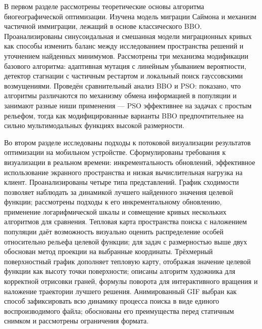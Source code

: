 \documentclass[14pt, russian]{scrartcl}
\begin{document}
В первом разделе рассмотрены теоретические основы алгоритма
биогеографической оптимизации. Изучена модель миграции Саймона и
механизм частичной иммиграции, лежащий в основе классического BBO.
Проанализированы синусоидальная и смешанная модели миграционных кривых
как способы изменить баланс между исследованием пространства решений и
уточнением найденных минимумов. Рассмотрены три механизма модификации
базового алгоритма: адаптивная мутация с линейным убыванием вероятности,
детектор стагнации с частичным рестартом и локальный поиск гауссовскими
возмущениями. Проведён сравнительный анализ BBO и PSO: 
показано, что алгоритмы различаются по механизму обмена
информацией в популяции и занимают разные ниши применения --- PSO
эффективнее на задачах с простым рельефом, тогда как модифицированные
варианты BBO предпочтительнее на сильно мультимодальных функциях высокой
размерности.

Во втором разделе исследованы подходы к потоковой визуализации
результатов оптимизации на мобильном устройстве. Сформулированы
требования к визуализации в реальном времени: инкрементальность
обновлений, эффективное использование экранного пространства и низкая
вычислительная нагрузка на клиент. Проанализированы четыре типа
представлений. График сходимости позволяет наблюдать за динамикой
лучшего найденного значения целевой функции; рассмотрены подходы к его
инкрементальному обновлению, применение логарифмической шкалы и
совмещение кривых нескольких алгоритмов для сравнения. Тепловая карта
пространства поиска с наложением популяции даёт возможность визуально
оценить распределение особей относительно рельефа целевой функции; для
задач с размерностью выше двух обоснован метод проекции на выбранные
координаты. Трёхмерный поверхностный график дополняет тепловую карту,
отображая значение целевой функции как высоту точки поверхности;
описаны алгоритм художника для корректной отрисовки граней, формулы
поворота для интерактивного вращения и наложение траектории лучшего
решения. Анимированный GIF выбран как способ зафиксировать всю
динамику процесса поиска в виде единого воспроизводимого файла;
обоснованы его преимущества перед статичным снимком и рассмотрены
ограничения формата.
\end{document}
